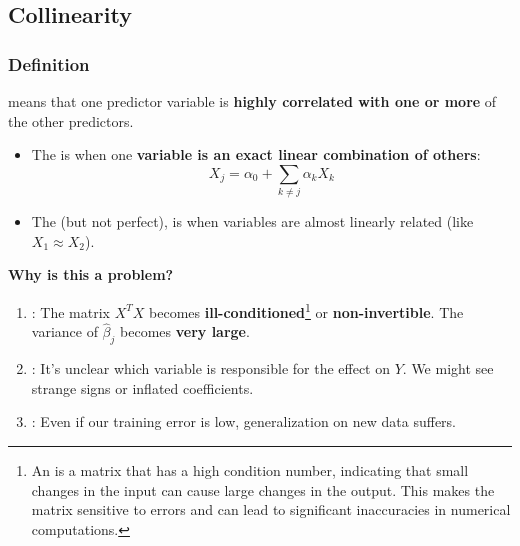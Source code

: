 \subsection{Collinearity}

\subsubsection{Definition}

 means that one predictor variable is \textbf{highly correlated with one or more} of the other predictors.
\begin{itemize}
    \item The  is when one \textbf{variable is an exact linear combination of others}:
    \begin{equation}\label{def: perfect collinearity}
        X_{j} = \alpha_{0} + \displaystyle\sum_{k \ne j} \alpha_{k} X_{k}
    \end{equation}

    \item The  (but not perfect), is when variables are almost linearly related (like $X_1 \approx X_2$).
\end{itemize}

\highspace
\begin{flushleft}
    \textcolor{Red2}{ \textbf{Why is this a problem?}}
\end{flushleft}
\begin{enumerate}
    \item {}: The matrix $X^TX$ becomes \textbf{ill-conditioned}\footnote{An  is a matrix that has a high condition number, indicating that small changes in the input can cause large changes in the output. This makes the matrix sensitive to errors and can lead to significant inaccuracies in numerical computations.} or \textbf{non-invertible}. The variance of $\hat{\beta}_j$ becomes \textbf{very large}.
    \item {}: It's unclear which variable is responsible for the effect on $Y$. We might see strange signs or inflated coefficients.
    \item {}: Even if our training error is low, generalization on new data suffers.
\end{enumerate}

